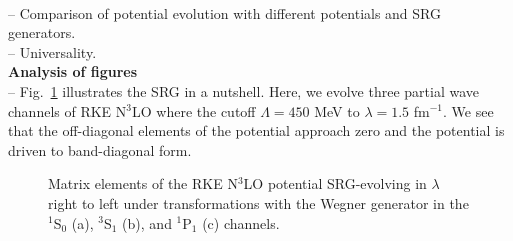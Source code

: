\documentclass[preprintnumbers,floatfix,aps,prc,preprint,nofootinbib]{revtex4-1}
\begin{document}
%
\\
-- Comparison of potential evolution with different potentials and SRG generators.
\\
-- Universality.
\\
\textbf{Analysis of figures}
\\
-- Fig.~\ref{fig:potential_contours_RKE_Wegner} illustrates the SRG in a nutshell. Here, we evolve three partial wave channels of RKE N$^3$LO \cite{Reinert:2017usi} where the cutoff $\Lambda=450$ MeV to $\lambda=1.5$ fm$^{-1}$. We see that the off-diagonal elements of the potential approach zero and the potential is driven to band-diagonal form.
%
\begin{figure}[H]
	\centering
	

	\caption{Matrix elements of the RKE N$^3$LO potential SRG-evolving in $\lambda$ right to left under transformations with the Wegner generator in the $^1$S$_0$ (a), $^3$S$_1$ (b), and $^1$P$_1$ (c) channels.}
	\label{fig:potential_contours_RKE_Wegner}
\end{figure}
\end{document}
